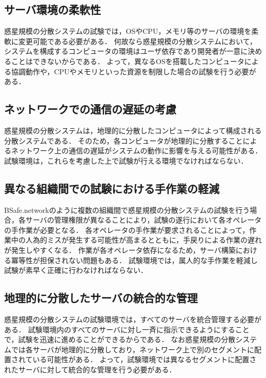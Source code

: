 \subsection{サーバ環境の柔軟性}
\label{issue:requirements1}

惑星規模の分散システムの試験では，OSやCPU，メモリ等のサーバの環境を柔軟に変更可能である必要がある．
何故なら惑星規模の分散システムにおいて，システムを構成するコンピュータの環境はユーザ依存であり開発者が一意に決めることはできないからである．
よって，異なるOSを搭載したコンピュータによる協調動作や，CPUやメモリといった資源を制限した場合の試験を行う必要がある．

\subsection{ネットワークでの通信の遅延の考慮}
\label{issue:requirements2}

惑星規模の分散システムは，地理的に分散したコンピュータによって構成される分散システムである．
そのため，各コンピュータが地理的に分散することによるネットワーク上の通信の遅延がシステムの動作に影響を与える可能性がある．
試験環境は，これらを考慮した上で試験が行える環境でなければならない．

\subsection{異なる組織間での試験における手作業の軽減}
\label{issue:requirements3}

BSafe.networkのように複数の組織間で惑星規模の分散システムの試験を行う場合，各サーバの管理権限が異なることにより，試験の遂行において各オペレータの手作業が必要となる．
各オペレータの手作業が要求されることによって，作業中の人為的ミスが発生する可能性が高まるとともに，手戻りによる作業の遅れが発生しやすくなる．
作業が各オペレータ依存になるため，サーバ構築における冪等性が担保されない問題もある．
試験環境では，属人的な手作業を軽減し試験が素早く正確に行わなければならない．

\subsection{地理的に分散したサーバの統合的な管理}
\label{issue:requirements4}

惑星規模の分散システムの試験環境では，すべてのサーバを統合管理する必要がある．
試験環境内のすべてのサーバに対し一斉に指示できるようにすることで，試験を迅速に進めることができるからである．
なお惑星規模の分散システムでは各サーバが地理的に分散しており，ネットワーク上で別のセグメントに配置されている可能性がある．
よって，試験環境では異なるセグメントに配置されたサーバに対して統合的な管理を行う必要がある．

